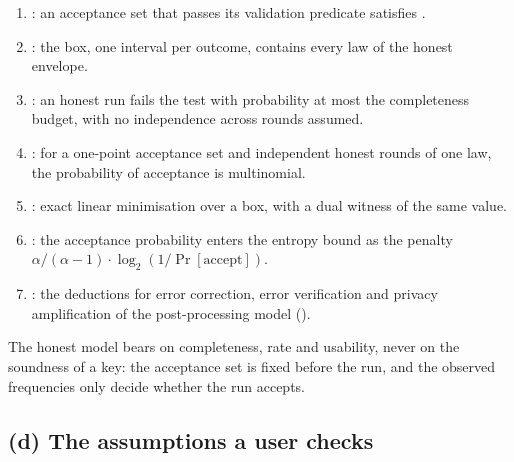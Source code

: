 \begin{enumerate}[itemsep=1pt]
\item {}: an acceptance set that passes
  its validation predicate satisfies .
\item {}: the box, one
  interval per outcome, contains every law of the honest envelope.
\item {}: an honest run
  fails the test with probability at most the completeness budget, with no
  independence across rounds assumed.
\item {}: for a one-point
  acceptance set and independent honest rounds of one law, the probability of
  acceptance is multinomial.
\item {}: exact linear minimisation over a box,
  with a dual witness of the same value.
\item {}: the acceptance probability
  enters the entropy bound as the penalty
  $\alpha/(\alpha-1)\cdot\log_2(1/\Pr[\mathrm{accept}])$.
\item {}: the deductions for error correction,
  error verification and privacy amplification of the post-processing model
  ().
\end{enumerate}
The honest model bears on completeness, rate and usability, never on the
soundness of a key: the acceptance set is fixed before the run, and the
observed frequencies only decide whether the run accepts.

\subsection*{(d) The assumptions a user checks}

